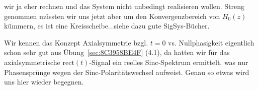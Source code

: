 wir ja eher rechnen und das System nicht unbedingt realisieren wollen. Streng genommen müssten wir uns
jetzt aber um den Konvergenzbereich von $H_0(z)$ kümmern, es ist eine Kreisscheibe...siehe dazu gute SigSys-Bücher.
%
\begin{center}
\end{center}
%
Wir kennen das Konzept Axialsymmetrie bzgl. $t=0$ vs. Nullphasigkeit eigentlich
schon sehr gut aus Übung~\ref{sec:8C3958BE4F} (4.1),
da hatten
wir für das axialsymmetrische $\mathrm{rect}(t)$-Signal ein reelles
Sinc-Spektrum ermittelt, was nur Phasensprünge wegen der Sinc-Polaritätswechsel aufweist.
Genau so etwas wird uns hier wieder begegnen.

